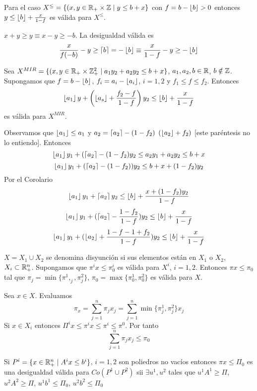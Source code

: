 \documentclass[MIOP.tex]{subfiles}
\begin{document}
\begin{coro}
Para el caso $X^\leq =\{(x,y\in\mathbb{R}_+\times \mathbb{Z} \mid y\leq b+x\}$ con $f=b-\left\lfloor{b}\right\rfloor>0$ entonces $y\leq \left\lfloor{b}\right\rfloor+\frac{x}{1-f}$ es válida para $X^\leq$.
\end{coro}
\begin{dem}
$x+y\geq y \equiv x-y\geq -b$. La desigualdad válida es 
$$
\frac{x}{f(-b)}-y\geq \left\lceil{b}\right\rceil=-\left\lfloor{b}\right\rfloor \equiv \frac{x}{1-f}-y \geq -\left\lfloor{b}\right\rfloor
$$
\end{dem}
\begin{propi}
Sea $X^{MIR}=\{(x,y\in\mathbb{R}_+\times \mathbb{Z}_+^2 \mid a_1y_2+a_2y_2\leq b+x\}$, $a_1,a_2,b\in\mathbb{R}$, $b\notin \mathbb{Z}$. Supongamos que $f=b-\left\lfloor{b}\right\rfloor$, $f_i = a_i -\left\lfloor{a_i}\right\rfloor$, $i=1,2$ y $f_1\leq f\leq f_2$. Entonces 
$$
\left\lfloor{a_1}\right\rfloor y+\left(\left\lfloor{a_s}\right\rfloor+\frac{f_2-f}{1-f}\right)y_2\leq \left\lfloor{b}\right\rfloor+\frac{x}{1-f}$$
es válida para $X^{MIR}$.
\end{propi}
\begin{dem}
Observamos que $\left\lfloor{a_1}\right\rfloor\leq a_1$ y $a_2=\left\lceil{a_2}\right\rceil-(1-f_2)$ $(\left\lfloor{a_2}\right\rfloor+f_2)$ [este paréntesis no lo entiendo]. Entonces
$$
\left\lfloor{a_1}\right\rfloor y_1+(\left\lceil{a_2}\right\rceil-(1-f_2)y_2 \leq a_2y_1 + a_2y_2\leq b+x
$$
$$\left\lfloor{a_1}\right\rfloor y_1+(\left\lceil{a_2}\right\rceil-(1-f_2))y_2 \leq b+x+(1-f_2)y_2$$
Por el Corolario
$$
\left\lfloor{a_1}\right\rfloor y_1+\left\lceil{a_2}\right\rceil y_2 \leq \left\lfloor{b}\right\rfloor+\frac{x+(1-f_2)y_2}{1-f}
$$
$$
\left\lfloor{a_1}\right\rfloor y_1+(\left\lceil{a_2}\right\rceil-\frac{1-f_2}{1-f})y_2 \leq \left\lfloor{b}\right\rfloor+\frac{x}{1-f}
$$
$$
\left\lfloor{a_1}\right\rfloor y_1+(\left\lfloor{a_2}\right\rfloor+\frac{1-f-1+f_2}{1-f})y_2\leq \left\lfloor{b}\right\rfloor+\frac{x}{1-f}
$$
\end{dem}
\begin{prop}
$X=X_1\cup X_2$ se denomina disyunción si sus elementos están en $X_1$ o $X_2$, $X_i\subset \mathbb{R}^n_+$. Supongamos que $\pi^ix\leq \pi^i_0$ es válida para $X^i$, $i=1,2$. Entonces $\pi x\leq \pi_0$ tal que $\pi_j=\min\{\pi^1,_j,\pi^2_j\}$, $\pi_0 =\max\{\pi^1_0,\pi^2_0\}$ es válida para $X$.
\end{prop}
\begin{dem}
Sea $x\in X$. Evaluamos
$$
\pi_x = \sum_{j=1}^n \pi_j x_j = \sum_{j=1}^n \min\{\pi_j^1,\pi_j^2\}x_j
$$
Si $x\in X_i$ entonces $\Pi^ix \leq \pi^i x \leq \pi^i \leq \pi^0$. Por tanto
$$
\sum_{j=1}^n \pi_j  x_j \leq \pi_0
$$
\end{dem}
\begin{prop}
Si $P^i = \{x\in\mathbb{R}^n_+\mid A^i x \leq b^i\}$, $i=1,2$ son poliedros no vacíos entonces $\pi x\leq \Pi_0$ es una desigualdad válida para $Co(P^1\cup P^2)$ sii $\exists u^1,u^2$ tales que $u^1A^1\geq \Pi$, $u^2A^2 \geq \Pi$, $u^1 b^1 \leq \Pi_0$, $u^2b^2\leq \Pi_0$
\end{prop}
\end{document}
